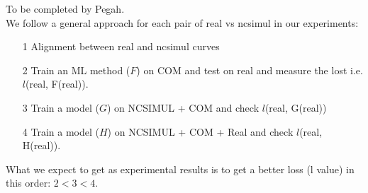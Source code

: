 To be completed by Pegah. \\
We follow a general approach for each pair of real vs ncsimul in our experiments:
\begin{itemize}
\item[1] Alignment between real and ncsimul curves
\item[2] Train an ML method ($F$) on COM and test on real and measure the lost i.e. $l$(real, F(real)).
\item[3] Train a model ($G$) on NCSIMUL + COM and check $l$(real, G(real))
\item[4] Train a model ($H$) on NCSIMUL + COM + Real and check $l$(real, H(real)).
\end{itemize}
What we expect to get as experimental results is to get a better loss (l value) in this order: $2 < 3 < 4$.